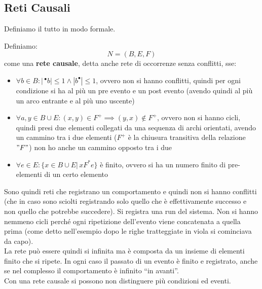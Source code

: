 \subsection{Reti Causali}
Definiamo il tutto in modo formale.
\begin{definizione}
  Definiamo:
  \[N=(B, E, F)\]
  come una \textbf{rete causale}, detta anche rete di occorrenze senza conflitti,
  sse:
  \begin{itemize}
    \item $\forall b\in B:|\,^{\bullet}b|\leq 1\land |b^{\bullet}|\leq 1$, ovvero
    non si hanno conflitti, quindi per ogni condizione si ha al più un pre
    evento e un post evento (avendo quindi al più un arco entrante e al più uno
    uscente)
    
    \item $\forall a, y\in B\cup E:(x, y)\in F^+\implies (y, x)\not\in F^+$, ovvero
    non si hanno cicli, quindi presi due elementi collegati da una sequenza di
    archi orientati, avendo un cammino tra i due elementi ($F^+$ è la chiusura
    transitiva della relazione $"F"$) non ho anche un cammino opposto tra i due
    \item $\forall e\in E:\{x\in B\cup E|\, xF^*e\}$ è finito, ovvero si ha un
    numero finito di pre-elementi di un certo elemento
  \end{itemize}
\end{definizione} \vspace{5mm} %
\begin{nota}
  Sono quindi reti che registrano un comportamento e quindi non si hanno
  conflitti (che in caso sono sciolti registrando solo quello che è
  effettivamente successo e non quello che potrebbe succedere). Si registra una
  run del sistema. Non si hanno nemmeno cicli perché ogni ripetizione
  dell'evento viene concatenata a quella prima (come detto nell'esempio dopo le
  righe tratteggiate in viola si cominciava da capo).\\
  La rete può essere quindi si infinita ma è composta da un insieme di elementi
  finito che si ripete. In ogni caso il passato di un evento è finito e
  registrato, anche se nel complesso il comportamento è infinito ``in
  avanti''. \\
  Con una rete causale si possono non distinguere più condizioni ed eventi.

\end{nota}
